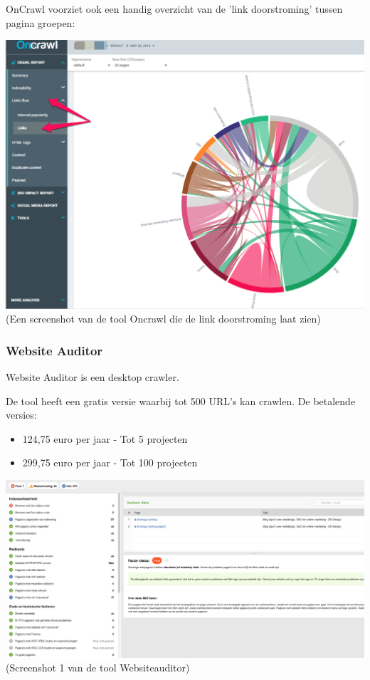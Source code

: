 OnCrawl voorziet ook een handig overzicht van de 'link doorstroming' tussen pagina groepen: 

\includegraphics[width=\linewidth]{Bachelorproef/bachelor/img/oncrawl-link-visualization.png}
(Een screenshot van de tool Oncrawl die de link doorstroming laat zien)

\subsubsection{Website Auditor}
\label{ch: Website Auditor}

Website Auditor is een desktop crawler. 

De tool heeft een gratis versie waarbij tot 500 URL's kan crawlen. 
De betalende versies: 
\begin{itemize}
\item 124,75 euro per jaar - Tot 5 projecten
\item 299,75 euro per jaar - Tot 100 projecten
\end{itemize}

\includegraphics[width=\linewidth]{Bachelorproef/bachelor/img/websiteauditor.PNG}
(Screenshot 1 van de tool Websiteauditor)

